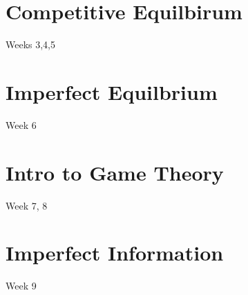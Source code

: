 \documentclass[12pt]{article}
\begin{document}
\section{Competitive Equilbirum}
Weeks 3,4,5
\section{Imperfect Equilbrium}
Week 6
\section{Intro to Game Theory}
Week 7, 8
\section{Imperfect Information}
Week 9
\end{document}
